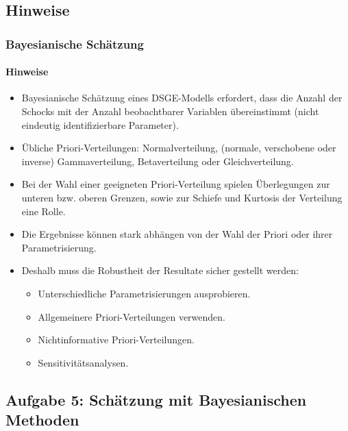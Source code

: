 \documentclass{beamer} %
\begin{document}
\subsection{Hinweise}
\begin{frame}\frametitle{Bayesianische Sch\"{a}tzung}\framesubtitle{Hinweise}
  \begin{itemize}
    \item Bayesianische Sch\"{a}tzung eines DSGE-Modells erfordert, dass die Anzahl der Schocks mit der Anzahl beobachtbarer Variablen
\"{u}bereinstimmt (nicht eindeutig identifizierbare Parameter).
    \item \"{U}bliche Priori-Verteilungen: Normalverteilung, (normale, verschobene oder inverse) Gammaverteilung, Betaverteilung oder Gleichverteilung.
    \item Bei der Wahl einer geeigneten Priori-Verteilung spielen \"{U}berlegungen zur unteren bzw. oberen Grenzen, sowie zur Schiefe und Kurtosis der Verteilung eine Rolle.
    \item Die Ergebnisse können stark abhängen von der Wahl der Priori oder ihrer Parametrisierung.
    \item Deshalb muss die Robustheit der Resultate sicher gestellt werden:
    \begin{itemize}
      \item Unterschiedliche Parametrisierungen ausprobieren.
      \item Allgemeinere Priori-Verteilungen verwenden.
      \item Nichtinformative Priori-Verteilungen.
      \item Sensitivitätsanalysen.
    \end{itemize}
  \end{itemize}
\end{frame}

\subsection{Aufgabe 5: Sch\"{a}tzung mit Bayesianischen Methoden}
\end{document}
